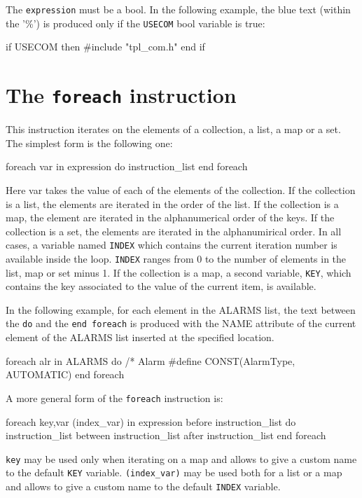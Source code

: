 \documentclass[10pt,openright,twosides,final]{memoir}
\newcommand{\var}[1]{{\small\ttfamily #1}}
\newcommand{\ccst}[1]{{\footnotesize\ttfamily\colorbox{light-blue}{'#1'}}}
\newcommand{\gtlinline}[1]{\colorbox{light-blue}{\lstinline[language=gtl]{#1}}}
\begin{document}
The \gtlinline{expression} must be a bool. In the following example, the blue text (within the \ccst{\%}) is produced only if the \gtlinline{USECOM} bool variable is true:

\begin{gtl}
if USECOM then %
#include "tpl_com.h" %
end if
\end{gtl}

\section{The \texttt{foreach} instruction}

This instruction iterates on the elements of a collection, a list, a map or a set. The simplest form is the following one:

\begin{gtl}
foreach var in expression do
  instruction_list
end foreach
\end{gtl}

Here var takes the value of each of the elements of the collection. If the collection is a list, the elements are iterated in the order of the list. If the collection is a map, the element are iterated in the alphanumerical order of the keys. If the collection is a set, the elements are iterated in the alphanumirical order. In all cases, a variable named \lstinline{INDEX} which contains the current iteration number is available inside the loop. \lstinline{INDEX} ranges from 0 to the number of elements in the list, map or set minus 1. If the collection is a map, a second variable, \lstinline{KEY}, which contains the key associated to the value of the current item, is available.

In the following example, for each element in the \var{ALARMS} list, the text between the \lstinline{do} and the \lstinline{end foreach} is produced with the \var{NAME} attribute of the current element of the \var{ALARMS} list inserted at the specified location.

\begin{gtl}
foreach alr in ALARMS do
%
/* Alarm %
#define %
CONST(AlarmType, AUTOMATIC) %
%
end foreach
\end{gtl}

A more general form of the \lstinline{foreach} instruction is:

\begin{gtl}
foreach key,var (index_var) in expression
  before
    instruction_list
  do 
    instruction_list
  between
    instruction_list
  after 
    instruction_list
end foreach
\end{gtl}
\gtlinline{key} may be used only when iterating on a map and allows to give a custom name to the default \gtlinline{KEY} variable. \gtlinline{(index_var)} may be used both for a list or a map and allows to give a custom name to the default \gtlinline{INDEX} variable.
\end{document}
